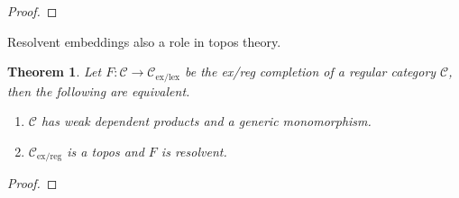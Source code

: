 \documentclass[sort&compress]{elsarticle}
\theoremstyle{plain}
\newtheorem{theorem}{Theorem}
\theoremstyle{definition}
\theoremstyle{remark}
\newcommand\hide[1]{}
\newcommand\cat\mathcal
\newcommand\exlex{_\mathrm{ex/lex}}\newcommand\exreg{_\mathrm{ex/reg}}
\begin{document}
\begin{proof}
\hide{Point ahead to lemmas down this paper}
\end{proof}

Resolvent embeddings also a role in topos theory.

\begin{theorem} Let $F:\cat C\to\cat C\exlex$ be the ex/reg completion of a regular category $\cat C$, then the following are equivalent.
\begin{enumerate}
\item $\cat C$ has \emph{weak dependent products} and a \emph{generic monomorphism}. \hide{these need to be defined somewhere}
\item $\cat C\exreg$ is a topos and $F$ is resolvent. 
\end{enumerate}
\end{theorem}

\begin{proof}
\hide{Point ahead to lemmas down this paper}
\end{proof}

\hide{conclusion... }
\end{document}

